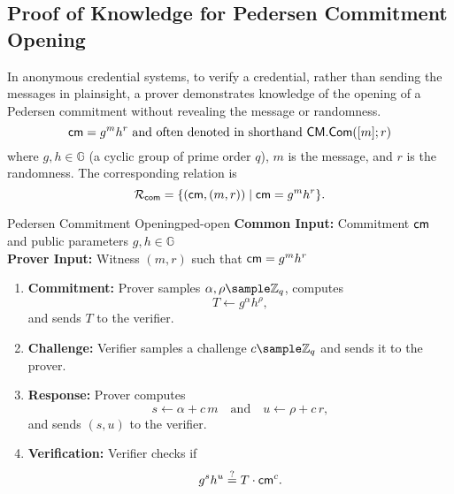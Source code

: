 



\newpage
\subsection{Proof of Knowledge for Pedersen Commitment Opening}\label{pok-com}

In anonymous credential systems, to verify a credential, rather than sending the messages in plainsight, a prover demonstrates knowledge of the opening of a Pedersen commitment without revealing the message or randomness. 
\[
    \mathsf{cm} = g^m h^r \text{   and often denoted in shorthand   } \mathsf{CM.Com}([m];r)
\]
where \(g, h \in \mathbb{G}\) (a cyclic group of prime order \(q\)), \(m\) is the message, and \(r\) is the randomness. The corresponding relation is
\[
    \mathcal{R}_{\mathsf{com}} = \{ (\mathsf{cm},(m,r)) \;|\; \mathsf{cm} = g^m h^r \}.
\]

\begin{protocol}{Pedersen Commitment Opening}{ped-open}
\textbf{Common Input:} Commitment \(\mathsf{cm}\) and public parameters \(g,h \in \mathbb{G}\)\\
\textbf{Prover Input:} Witness \((m,r)\) such that \(\mathsf{cm} = g^m h^r\)
\begin{enumerate}
    \item \textbf{Commitment:} Prover samples \(\alpha, \rho \sample \Z_q\), computes 
    \[
      T \gets g^{\alpha}h^{\rho},
    \]
    and sends \(T\) to the verifier.
    \item \textbf{Challenge:} Verifier samples a challenge \(c \sample \Z_q\) and sends it to the prover.
    \item \textbf{Response:} Prover computes 
    \[
      s \gets \alpha + c\,m \quad \text{and} \quad u \gets \rho + c\,r,
    \]
    and sends \((s,u)\) to the verifier.
    \item \textbf{Verification:} Verifier checks if 
    \[
      g^s h^u \stackrel{?}{=} T \cdot \mathsf{cm}^c.
    \]
\end{enumerate}
\end{protocol}

